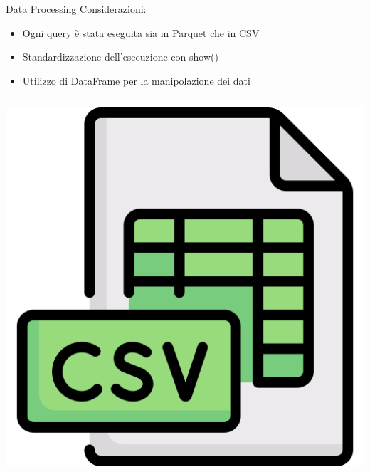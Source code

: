 \documentclass[13pt,aspectratio=169,t,xcolor=table]{beamer}
\begin{document}
\begin{frame}{Data Processing}
    Considerazioni:
    \begin{itemize}
        \item Ogni query è stata eseguita sia in Parquet che in CSV
        \item Standardizzazione dell'esecuzione con show()
        \item Utilizzo di DataFrame per la manipolazione dei dati
    \end{itemize}
    \vspace{1cm}
    \begin{columns}
            \begin{minipage}{0.3\textwidth}
                \begin{adjustbox}{margin=4cm 0cm 0cm 0cm, center}
                    \includegraphics[width=1\textwidth]{res/csv.png}
                \end{adjustbox}
            \end{minipage}
        \begin{minipage}{0.5\textwidth}
            \begin{adjustbox}{margin=0cm 0cm 0.8cm 0cm, center}

\end{adjustbox}
\end{minipage}
\end{columns}
\end{frame}
\end{document}
